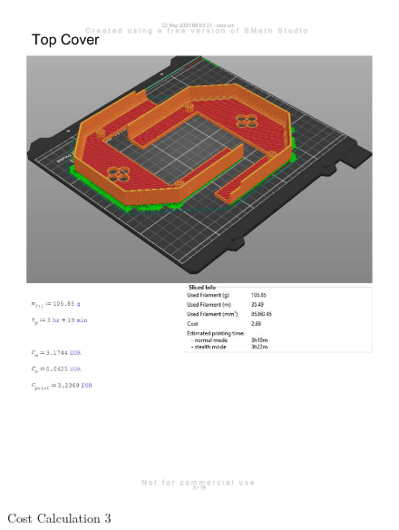 \begin{figure}[H]
    \centering
    \includegraphics[width=\linewidth]{texs/appendix/data/costcalculation/cost1-03.jpg}
    \caption{Cost Calculation 3}
    \label{fig:cost-calculation-3}
\end{figure}

